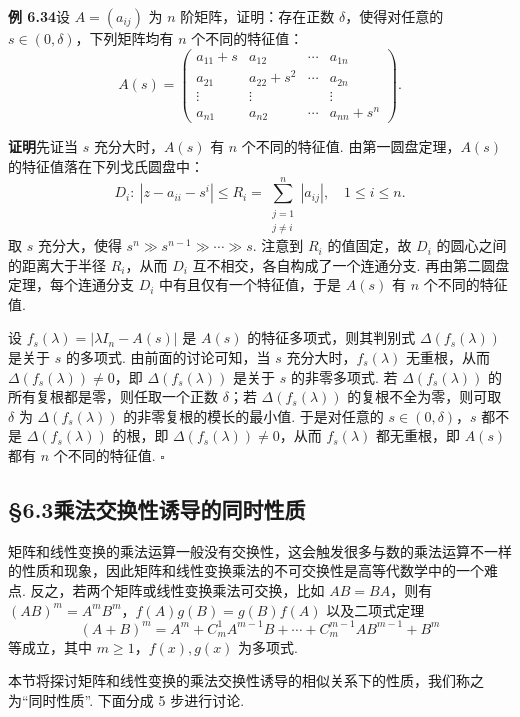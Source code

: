 \documentclass[UTF8,12pt,a4paper,fontset=fandol]{ctexart}
\begin{document}
\noindent\textbf{例 6.34}\quad 设 $A=(a_{ij})$ 为 $n$ 阶矩阵，证明：存在正数 $\delta$，使得对任意的 $s\in(0,\delta)$，下列矩阵均有 $n$ 个不同的特征值：
\[
A(s)=\left(\begin{array}{cccc}
a_{11}+s & a_{12} & \cdots & a_{1n}\\
a_{21} & a_{22}+s^2 & \cdots & a_{2n}\\
\vdots & \vdots & & \vdots\\
a_{n1} & a_{n2} & \cdots & a_{nn}+s^n
\end{array}\right).
\]

\noindent\textbf{证明}\quad 先证当 $s$ 充分大时，$A(s)$ 有 $n$ 个不同的特征值. 由第一圆盘定理，$A(s)$ 的特征值落在下列戈氏圆盘中：
\[
D_i:\ |z-a_{ii}-s^i|\le R_i=\sum_{\substack{j=1\\j\ne i}}^n |a_{ij}|,\quad 1\le i\le n.
\]
取 $s$ 充分大，使得 $s^n\gg s^{n-1}\gg\cdots\gg s$. 注意到 $R_i$ 的值固定，故 $D_i$ 的圆心之间的距离大于半径 $R_i$，从而 $D_i$ 互不相交，各自构成了一个连通分支. 再由第二圆盘定理，每个连通分支 $D_i$ 中有且仅有一个特征值，于是 $A(s)$ 有 $n$ 个不同的特征值.

设 $f_s(\lambda)=|\lambda I_n-A(s)|$ 是 $A(s)$ 的特征多项式，则其判别式 $\Delta(f_s(\lambda))$ 是关于 $s$ 的多项式. 由前面的讨论可知，当 $s$ 充分大时，$f_s(\lambda)$ 无重根，从而 $\Delta(f_s(\lambda))\ne 0$，即 $\Delta(f_s(\lambda))$ 是关于 $s$ 的非零多项式. 若 $\Delta(f_s(\lambda))$ 的所有复根都是零，则任取一个正数 $\delta$；若 $\Delta(f_s(\lambda))$ 的复根不全为零，则可取 $\delta$ 为 $\Delta(f_s(\lambda))$ 的非零复根的模长的最小值. 于是对任意的 $s\in(0,\delta)$，$s$ 都不是 $\Delta(f_s(\lambda))$ 的根，即 $\Delta(f_s(\lambda))\ne 0$，从而 $f_s(\lambda)$ 都无重根，即 $A(s)$ 都有 $n$ 个不同的特征值. $\square$

\subsection*{§6.3\quad 乘法交换性诱导的同时性质}

矩阵和线性变换的乘法运算一般没有交换性，这会触发很多与数的乘法运算不一样的性质和现象，因此矩阵和线性变换乘法的不可交换性是高等代数学中的一个难点. 反之，若两个矩阵或线性变换乘法可交换，比如 $AB=BA$，则有 $(AB)^m=A^mB^m$，$f(A)g(B)=g(B)f(A)$ 以及二项式定理
\[
(A+B)^m=A^m+C_m^1A^{m-1}B+\cdots+C_m^{m-1}AB^{m-1}+B^m
\]
等成立，其中 $m\ge 1$，$f(x),g(x)$ 为多项式.

本节将探讨矩阵和线性变换的乘法交换性诱导的相似关系下的性质，我们称之为“同时性质”. 下面分成 5 步进行讨论.
\end{document}
